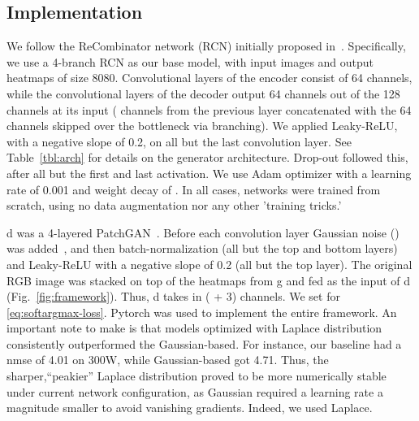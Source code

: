 \documentclass[10pt,twocolumn,letterpaper]{article}
\begin{document}
\subsection{Implementation}
\label{sec:implementation}
We follow the ReCombinator network (RCN) initially proposed in~\cite{honari2016recombinator}. Specifically, we use a 4-branch RCN as our base model, with input images and output heatmaps of size 8080. Convolutional layers of the encoder consist of 64 channels, while the convolutional layers of the decoder output 64 channels out of the 128 channels at its input ( channels from the previous layer concatenated with the 64 channels skipped over the bottleneck via branching). We applied Leaky-ReLU, with a negative slope of 0.2, on all but the last convolution layer. See Table~\ref{tbl:arch} for details on the generator architecture. Drop-out followed this, after all but the first and last activation. We use Adam optimizer with a learning rate of 0.001 and weight decay of . In all cases, networks were trained from scratch, using no data augmentation nor any other 'training tricks.' 

\gls{d} was a 4-layered PatchGAN~\cite{isola2017image}. Before each convolution layer Gaussian noise () was added~\cite{tulyakov2017mocogan}, and then batch-normalization (all but the top and bottom layers) and Leaky-ReLU with a negative slope of 0.2 (all but the top layer). The original RGB image was stacked on top of the  heatmaps from \gls{g} and fed as the input of \gls{d} (Fig.~\ref{fig:framework}). Thus, \gls{d} takes in ( + 3) channels. We set  for \ref{eq:softargmax-loss}. Pytorch was used to implement the entire framework. An important note to make is that models optimized with Laplace distribution consistently outperformed the Gaussian-based. For instance, our  baseline had a \gls{nmse} of 4.01 on 300W, while Gaussian-based got 4.71. Thus, the sharper,``peakier'' Laplace distribution proved to be more numerically stable under current network configuration, as Gaussian required a learning rate a magnitude smaller to avoid vanishing gradients. Indeed, we used Laplace.
\end{document}

